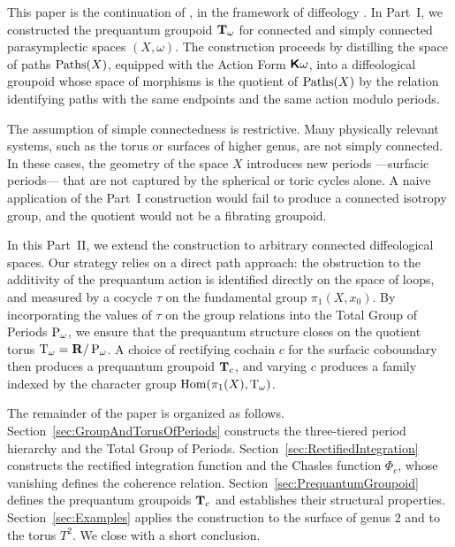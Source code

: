 \documentclass[11pt,reqno,letterpaper,twoside]{amsart}
\begin{document}
  This paper is the continuation of \cite{PIZ25a},
  in the framework of diffeology \cite{PIZ13}.
  In Part~I,
  we constructed the prequantum groupoid $\mathbf{T}_\omega$ for connected and simply connected parasymplectic spaces $(X, \omega)$.
  The construction proceeds by distilling the space of paths $\operatorname{Paths}(X)$,
  equipped with the Action Form $\boldsymbol{\mathsf{K}}\omega$,
  into a diffeological groupoid whose space of morphisms is the quotient of $\operatorname{Paths}(X)$ by the relation identifying paths with the same endpoints and the same action modulo periods.
  
  The assumption of simple connectedness is restrictive.
  Many physically relevant systems,
  such as the torus or surfaces of higher genus,
  are not simply connected.
  In these cases,
  the geometry of the space $X$ introduces new periods
  ---surfacic periods---
  that are not captured by the spherical or toric cycles alone.
  A naive application of the Part~I construction would fail to produce a connected isotropy group,
  and the quotient would not be a fibrating groupoid.
  
  In this Part~II,
  we extend the construction to arbitrary connected diffeological spaces.
  Our strategy relies on a direct path approach:
  the obstruction to the additivity of the prequantum action is identified directly on the space of loops,
  and measured by a cocycle $\tau$ on the fundamental group $\pi_1(X, x_0)$.
  By incorporating the values of $\tau$ on the group relations into the Total Group of Periods $\operatorname{P}_\omega$,
  we ensure that the prequantum structure closes on the quotient torus $\mathrm{T}_\omega = {\mathbf{R}}/\operatorname{P}_\omega$.
  A choice of rectifying cochain $c$ for the surfacic coboundary then produces a prequantum groupoid $\mathbf{T}_c$,
  and varying $c$ produces a family indexed by the character group $\mathrm{Hom}(\pi_1(X), \mathrm{T}_\omega)$.
  
  The remainder of the paper is organized as follows.
  Section~\ref{sec:GroupAndTorusOfPeriods} constructs the three-tiered period hierarchy and the Total Group of Periods.
  Section~\ref{sec:RectifiedIntegration} constructs the rectified integration function and the Chasles function $\Phi_c$,
  whose vanishing defines the coherence relation.
  Section~\ref{sec:PrequantumGroupoid} defines the prequantum groupoids $\mathbf{T}_c$ and establishes their structural properties.
  Section~\ref{sec:Examples} applies the construction to the surface of genus $2$ and to the torus $T^2$.
  We close with a short conclusion.
  
\end{document}
